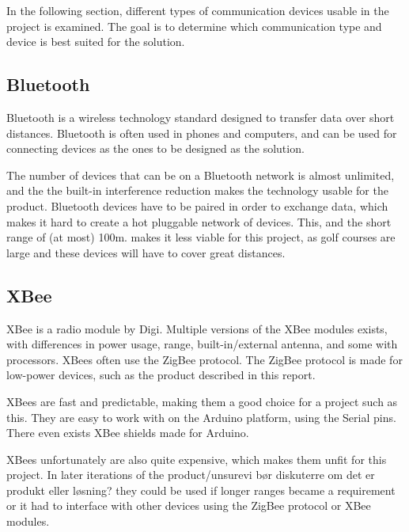 In the following section, different types of communication devices usable in the project is examined. The goal is to determine which communication type and device is best suited for the solution.

\subsection{Bluetooth}
Bluetooth is a wireless technology standard designed to transfer data over short distances. Bluetooth is often used in phones and computers, and can be used for connecting devices as the ones to be designed as the solution. 

The number of devices that can be on a Bluetooth network is almost unlimited, and the the built-in interference reduction makes the technology usable for the product\cite{bluetoothbasics}.
Bluetooth devices have to be paired in order to exchange data, which makes it hard to create a hot pluggable network of devices. This, and the short range of (at most) 100m\cite{bluetoothbasics}. makes it less viable for this project, as golf courses are large and these devices will have to cover great distances.

\subsection{XBee}
XBee is a radio module by Digi. Multiple versions of the XBee modules exists, with differences in power usage, range, built-in/external antenna, and some with processors\cite{sparkfunXbeeGuide}.
XBees often use the ZigBee protocol. The ZigBee protocol is made for low-power devices, such as the product described in this report\cite{zigbee}.

XBees are fast and predictable, making them a good choice for a project such as this. They are easy to work with on the Arduino platform, using the Serial pins. There even exists XBee shields made for Arduino.

XBees unfortunately are also quite expensive, which makes them unfit for this project. In later iterations of the product/unsure{vi bør diskuterre om det er produkt eller løsning?}  they could be used if longer ranges became a requirement or it had to interface with other devices using the ZigBee protocol or XBee modules.


